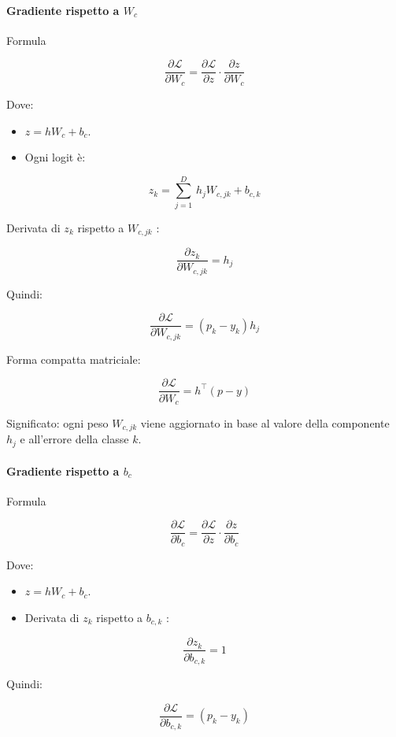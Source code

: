 \documentclass[
  11pt,
]{article}
\begin{document}
\paragraph{Gradiente rispetto a $W_c$}


Formula

\[\frac{\partial\mathcal{L}}{\partial W_{c}} = \frac{\partial\mathcal{L}}{\partial z} \cdot \frac{\partial z}{\partial W_{c}}\]

Dove:


\begin{itemize}
\item
  \(z = hW_{c} + b_{c}\).
\item
  Ogni logit è:
\end{itemize}


\[z_{k} = \sum_{j = 1}^{D}\, h_{j}W_{c,jk} + b_{c,k}\]


Derivata di \(z_{k}\) rispetto a \(W_{c,jk}\) :


\[\frac{\partial z_{k}}{\partial W_{c,jk}} = h_{j}\]


Quindi:


\[\frac{\partial\mathcal{L}}{\partial W_{c,jk}} = \left( p_{k} - y_{k} \right)h_{j}\]


Forma compatta matriciale:


\[\frac{\partial\mathcal{L}}{\partial W_{c}} = h^{\top}(p - y)\]

Significato: ogni peso \(W_{c,jk}\) viene aggiornato in base al valore
della componente \(h_{j}\) e all'errore della classe
\(k\).


\paragraph{Gradiente rispetto a $b_c$}


Formula

\[\frac{\partial\mathcal{L}}{\partial b_{c}} = \frac{\partial\mathcal{L}}{\partial z} \cdot \frac{\partial z}{\partial b_{c}}\]

Dove:


\begin{itemize}
\item
  \(z = hW_{c} + b_{c}\).
\item
  Derivata di \(z_{k}\) rispetto a \(b_{c,k}\) :
\end{itemize}


\[\frac{\partial z_{k}}{\partial b_{c,k}} = 1\]


Quindi:


\[\frac{\partial\mathcal{L}}{\partial b_{c,k}} = \left( p_{k} - y_{k} \right)\]
\end{document}
